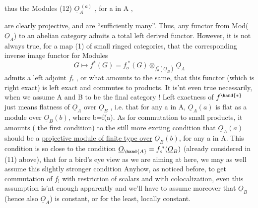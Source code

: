 
thus the Modules
(12) \qquad $\underline{O}_A^{\;(a)}$ \quad , for a in A \quad ,

are clearly projective, and  are ``sufficiently many''. Thus,
any  functor from Mod($\underline{O}_A$) to an abelian category admits a total left
derived functor. However, it is not always true, for a map (1)
of small ringed categories, that the corresponding inverse image
functor for Modules
\[ G \longmapsto f^{*}(G)= f_o^{\;*}(G) \otimes_{f_o^{*}(\underline{O}_B)} \underline{O}_A \]
admits  a left adjoint $f_{!}$ , or what amounts to the same, that
this functor (which is right exact) is left exact and commutes to
  products. It is'nt even true necessarily, when we assume
A and B to be the final category ! Left exactness of $f^{\hand{*}}$ just means
flatness of $\underline{O}_A$ over $\underline{O}_B$ , i.e. that for any a in A, $\underline{O}_A(a)$ is flat as
a module over $\underline{O}_B(b)$, where b=f(a). As for commutation to small
products, it amounts (  the first condition) to the
still more excting condition that $\underline{O}_A(a)$ should be a \uline{projective module
of finite type over} $\underline{O}_B(b)$, for any a in A. This condition is so close
to the condition $\underline{O}_{\hand{A}} = f_o^{\;*}(\underline{O}_B)$ \quad (already considered in (11) above),
that for a bird's eye view as we are aiming at here, we may as well
assume this slightly stronger condition\hand{!} Anyhow, as noticed before,
to get  commutation of $f_{!}$ with restriction of scalars
and with colocalization, even this assumption is'nt enough apparently\hand{,}
and we'll have to assume moreover that $\underline{O}_B$ (hence also $\underline{O}_A$) is constant,
or for the least, locally constant.


